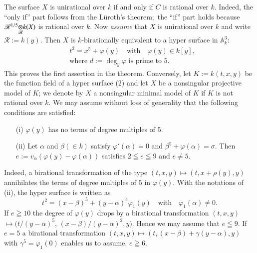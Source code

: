 The surface $X$ is unirational over $k$ if and only if $C$ is rational
over $k$. Indeed, the ``only if'' part follows from the L\"uroth's
theorem;\pageoriginale\ the ``if'' part holds because
$\foprod{\mathscr{R}^{1/5}}{k(X)}{\mathscr{R}}$ is rational over
$k$. Now {\em assume} that $X$ is unirational over $k$ and write
$\mathscr{R}:=k(y)$. Then $X$ is $k$-birationally equivalent to a
hyper surface in $\mathbb{A}^{3}_{k}$:
\begin{align*}
& t^{2}=x^{5}+\varphi(y)\quad\text{with}\quad \varphi(y)\in k[y],\tag{2}\\
& \text{where } d:=\deg_{y}\varphi\text{ \  is prime to 5.}
\end{align*}
This proves the first assertion in the theorem. Conversely, let
$K:=k(t,x,y)$ be the function field of a hyper surface (2) and let $X$
be a nonsingular projective model of $K$; we denote by $X$ a
nonsingular minimal model of $K$ if $K$ is not rational over $k$. We
may assume without loss of generality that the following conditions
are satisfied:
\begin{itemize}
\item[(i)] $\varphi(y)$ has no terms of degree multiples of $5$.

\item[(ii)] Let $\alpha$ and $\beta(\in k)$ satisfy
  $\varphi'(\alpha)=0$ and $\beta^{5}+\varphi(\alpha)=\sigma$. Then
  $e:=v_{\alpha}(\varphi(y)-\varphi(\alpha))$ satisfies $2\leqq e\leqq
  9$ and $e\neq 5$.
\end{itemize}
Indeed, a birational transformation of the type $(t,x,y)\mapsto
(t,x+\rho(y),y)$ annihilates the terms of degree multiples of $5$ in
$\varphi(y)$. With the notations of (ii), the hyper surface is written
as 
$$
t^{2}=(x-\beta)^{5}+(y-\alpha)^{e}\varphi_{1}(y)\quad\text{with}\quad
\varphi_{1}(\alpha)\neq 0.
$$
If $e\geqq 10$ the degree of $\varphi(y)$ drops by a birational
transformation $(t,x,y)$ $\mapsto (t/(y-\alpha)^{5}$,
$(x-\beta)/(y-\alpha)^{2},y)$. Hence we may assume that $e\leqq 9$. If
$e=5$ a birational transformation $(t,x,y)\mapsto
(t,(x-\beta)+\gamma(y-\alpha),y)$ with $\gamma^{5}=\varphi_{1}(0)$
enables us to assume. $e\geqq 6$. 

